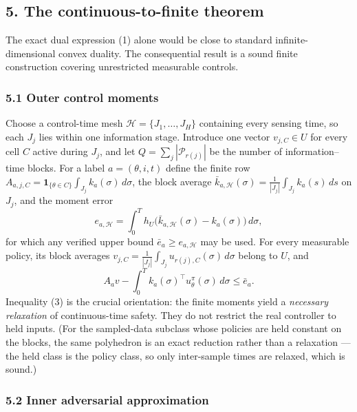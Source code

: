 \documentclass[10pt,twocolumn]{article}
\theoremstyle{definition}
\begin{document}
\subsection{5. The continuous-to-finite theorem}\label{bridge}

The exact dual expression (1) alone would be close to standard
infinite-dimensional convex duality. The consequential result is a sound
finite construction covering unrestricted measurable controls.

\subsubsection{5.1 Outer control moments}\label{outer}

Choose a control-time mesh \(\mathcal{H} = \{J_1,\dots,J_H\}\) containing
every sensing time, so each \(J_j\) lies within one information stage.
Introduce one vector \(v_{j,C} \in U\) for every cell \(C\) active during
\(J_j\), and let \(Q = \sum_j |\mathcal{P}_{r(j)}|\) be the number of
information--time blocks. For a label \(a = (\theta, i, t)\) define the
finite row
\(A_{a,j,C} = \mathbf{1}_{\{\theta \in C\}} \int_{J_j} k_a(\sigma)\,
d\sigma\), the block average
\(\bar{k}_{a,\mathcal{H}}(\sigma) = \frac{1}{|J_j|} \int_{J_j} k_a(s)\, ds\)
on \(J_j\), and the moment error
\[
e_{a,\mathcal{H}} = \int_0^T h_U\!\bigl(\bar{k}_{a,\mathcal{H}}(\sigma)
- k_a(\sigma)\bigr)\, d\sigma,
\tag{2}
\]
for which any verified upper bound \(\bar{e}_a \ge e_{a,\mathcal{H}}\) may be
used. For every measurable policy, its block averages
\(v_{j,C} = \frac{1}{|J_j|} \int_{J_j} u_{r(j),C}(\sigma)\, d\sigma\) belong
to \(U\), and
\[
A_a v - \int_0^T k_a(\sigma)^\top u^\pi_\theta(\sigma)\, d\sigma
\le \bar{e}_a.
\tag{3}
\]
Inequality (3) is the crucial orientation: the finite moments yield a
\emph{necessary relaxation} of continuous-time safety. They do not restrict
the real controller to held inputs. (For the sampled-data subclass whose
policies are held constant on the blocks, the same polyhedron is an exact
reduction rather than a relaxation --- the held class is the policy class, so
only inter-sample times are relaxed, which is sound.)

\subsubsection{5.2 Inner adversarial approximation}\label{inner}
\end{document}

